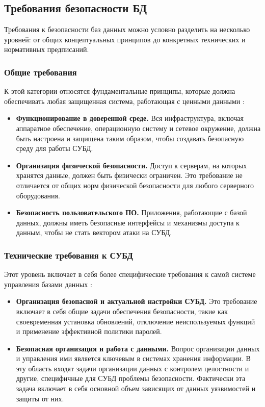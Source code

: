 \subsection{Требования безопасности БД}
Требования к безопасности баз данных можно условно разделить на несколько уровней: от общих концептуальных принципов до конкретных технических и нормативных предписаний. 

\subsubsection{Общие требования}
К этой категории относятся фундаментальные принципы, которые должна обеспечивать любая защищенная система, работающая с ценными данными \autocite{LAPA, Pirogov2009}:
\begin{itemize}
    \item \textbf{Функционирование в доверенной среде.} Вся инфраструктура, включая аппаратное обеспечение, операционную систему и сетевое окружение, должна быть настроена и защищена таким образом, чтобы создавать безопасную среду для работы СУБД.
    \item \textbf{Организация физической безопасности.} Доступ к серверам, на которых хранятся данные, должен быть физически ограничен. Это требование не отличается от общих норм физической безопасности для любого серверного оборудования.
    \item \textbf{Безопасность пользовательского ПО.} Приложения, работающие с базой данных, должны иметь безопасные интерфейсы и механизмы доступа к данным, чтобы не стать вектором атаки на СУБД.
\end{itemize}

\subsubsection{Технические требования к СУБД}
Этот уровень включает в себя более специфические требования к самой системе управления базами данных \autocite{LAPA, Pirogov2009}:
\begin{itemize}
    \item \textbf{Организация безопасной и актуальной настройки СУБД.} Это требование включает в себя общие задачи обеспечения безопасности, такие как своевременная установка обновлений, отключение неиспользуемых функций и применение эффективной политики паролей.
    \item \textbf{Безопасная организация и работа с данными.} Вопрос организации данных и управления ими является ключевым в системах хранения информации. В эту область входят задачи организации данных с контролем целостности и другие, специфичные для СУБД проблемы безопасности. Фактически эта задача включает в себя основной объем зависящих от данных уязвимостей и защиты от них.
\end{itemize}

